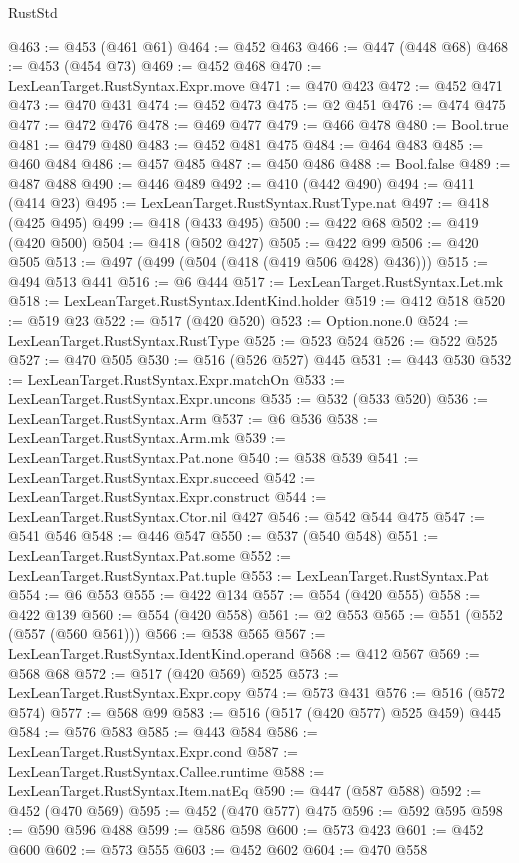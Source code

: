 \begin{lexlean}{RustStd}
\begin{coremodule}
@463 := @453 (@461 @61)
@464 := @452 @463
@466 := @447 (@448 @68)
@468 := @453 (@454 @73)
@469 := @452 @468
@470 := LexLeanTarget.RustSyntax.Expr.move
@471 := @470 @423
@472 := @452 @471
@473 := @470 @431
@474 := @452 @473
@475 := @2 @451
@476 := @474 @475
@477 := @472 @476
@478 := @469 @477
@479 := @466 @478
@480 := Bool.true
@481 := @479 @480
@483 := @452 @481 @475
@484 := @464 @483
@485 := @460 @484
@486 := @457 @485
@487 := @450 @486
@488 := Bool.false
@489 := @487 @488
@490 := @446 @489
@492 := @410 (@442 @490)
@494 := @411 (@414 @23)
@495 := LexLeanTarget.RustSyntax.RustType.nat
@497 := @418 (@425 @495)
@499 := @418 (@433 @495)
@500 := @422 @68
@502 := @419 (@420 @500)
@504 := @418 (@502 @427)
@505 := @422 @99
@506 := @420 @505
@513 := @497 (@499 (@504 (@418 (@419 @506 @428) @436)))
@515 := @494 @513 @441
@516 := @6 @444
@517 := LexLeanTarget.RustSyntax.Let.mk
@518 := LexLeanTarget.RustSyntax.IdentKind.holder
@519 := @412 @518
@520 := @519 @23
@522 := @517 (@420 @520)
@523 := Option.none.{0}
@524 := LexLeanTarget.RustSyntax.RustType
@525 := @523 @524
@526 := @522 @525
@527 := @470 @505
@530 := @516 (@526 @527) @445
@531 := @443 @530
@532 := LexLeanTarget.RustSyntax.Expr.matchOn
@533 := LexLeanTarget.RustSyntax.Expr.uncons
@535 := @532 (@533 @520)
@536 := LexLeanTarget.RustSyntax.Arm
@537 := @6 @536
@538 := LexLeanTarget.RustSyntax.Arm.mk
@539 := LexLeanTarget.RustSyntax.Pat.none
@540 := @538 @539
@541 := LexLeanTarget.RustSyntax.Expr.succeed
@542 := LexLeanTarget.RustSyntax.Expr.construct
@544 := LexLeanTarget.RustSyntax.Ctor.nil @427
@546 := @542 @544 @475
@547 := @541 @546
@548 := @446 @547
@550 := @537 (@540 @548)
@551 := LexLeanTarget.RustSyntax.Pat.some
@552 := LexLeanTarget.RustSyntax.Pat.tuple
@553 := LexLeanTarget.RustSyntax.Pat
@554 := @6 @553
@555 := @422 @134
@557 := @554 (@420 @555)
@558 := @422 @139
@560 := @554 (@420 @558)
@561 := @2 @553
@565 := @551 (@552 (@557 (@560 @561)))
@566 := @538 @565
@567 := LexLeanTarget.RustSyntax.IdentKind.operand
@568 := @412 @567
@569 := @568 @68
@572 := @517 (@420 @569) @525
@573 := LexLeanTarget.RustSyntax.Expr.copy
@574 := @573 @431
@576 := @516 (@572 @574)
@577 := @568 @99
@583 := @516 (@517 (@420 @577) @525 @459) @445
@584 := @576 @583
@585 := @443 @584
@586 := LexLeanTarget.RustSyntax.Expr.cond
@587 := LexLeanTarget.RustSyntax.Callee.runtime
@588 := LexLeanTarget.RustSyntax.Item.natEq
@590 := @447 (@587 @588)
@592 := @452 (@470 @569)
@595 := @452 (@470 @577) @475
@596 := @592 @595
@598 := @590 @596 @488
@599 := @586 @598
@600 := @573 @423
@601 := @452 @600
@602 := @573 @555
@603 := @452 @602
@604 := @470 @558

\end{coremodule}
\end{lexlean}
